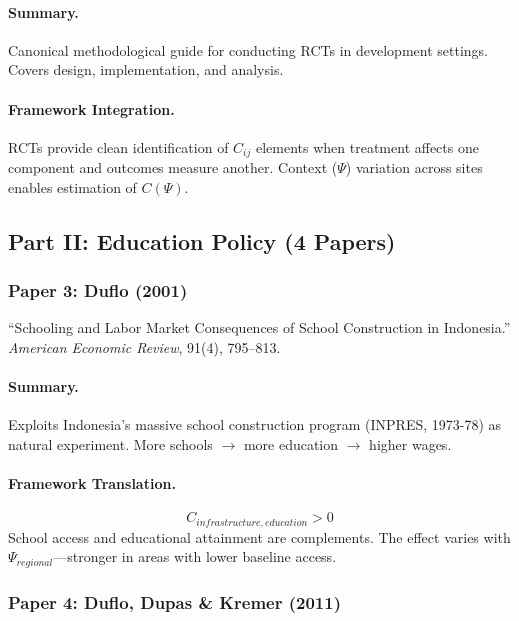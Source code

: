 \paragraph{Summary.}
Canonical methodological guide for conducting RCTs in development settings.
Covers design, implementation, and analysis.

\paragraph{Framework Integration.}
RCTs provide clean identification of $C_{ij}$ elements when treatment affects
one component and outcomes measure another. Context ($\Psi$) variation across
sites enables estimation of $C(\Psi)$.

\subsection{Part II: Education Policy (4 Papers)}

\subsubsection{Paper 3: Duflo (2001)}

``Schooling and Labor Market Consequences of School Construction in Indonesia.''
\textit{American Economic Review}, 91(4), 795--813.

\paragraph{Summary.}
Exploits Indonesia's massive school construction program (INPRES, 1973-78) as
natural experiment. More schools $\rightarrow$ more education $\rightarrow$ higher wages.

\paragraph{Framework Translation.}
\begin{equation}
  C_{infrastructure, education} > 0
\end{equation}
School access and educational attainment are complements. The effect varies with
$\Psi_{regional}$---stronger in areas with lower baseline access.

\subsubsection{Paper 4: Duflo, Dupas \& Kremer (2011)}

